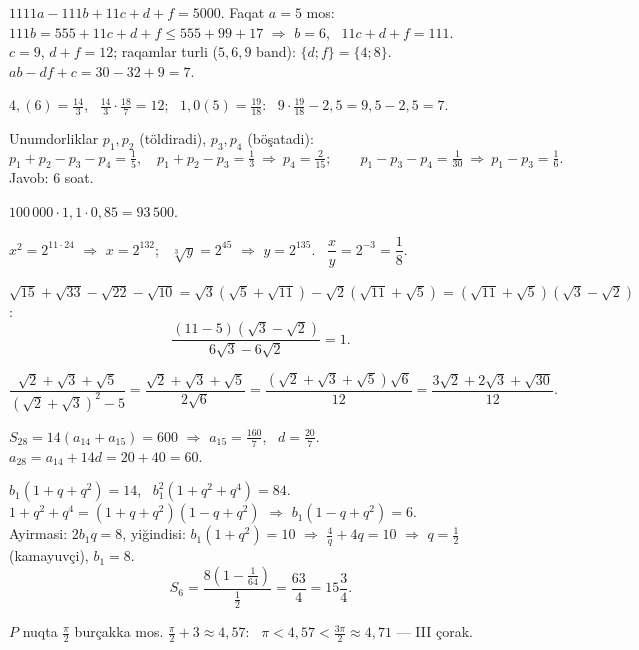 




$1111a-111b+11c+d+f=5000$. Faqat $a=5$ mos: $111b=555+11c+d+f\le555+99+17$ $\Rightarrow$ $b=6$, \ $11c+d+f=111$.\\
$c=9$, $d+f=12$; raqamlar turli ($5,6,9$ band): $\{d;f\}=\{4;8\}$. \ $ab-df+c=30-32+9=7$.

$4{,}(6)=\frac{14}3$, \ $\frac{14}3\cdot\frac{18}7=12$; \ $1{,}0(5)=\frac{19}{18}$: \ $9\cdot\frac{19}{18}-2{,}5=9{,}5-2{,}5=7$.

Unumdorliklar $p_1,p_2$ (töldiradi), $p_3,p_4$ (böşatadi):
\[p_1+p_2-p_3-p_4=\tfrac15,\quad p_1+p_2-p_3=\tfrac13\ \Rightarrow\ p_4=\tfrac2{15};\qquad p_1-p_3-p_4=\tfrac1{30}\ \Rightarrow\ p_1-p_3=\tfrac16.\]
Javob: $6$ soat.

$100\,000\cdot1{,}1\cdot0{,}85=93\,500$.

$x^2=2^{11\cdot24}$ $\Rightarrow$ $x=2^{132}$; \ $\sqrt[3]y=2^{45}$ $\Rightarrow$ $y=2^{135}$. \ $\dfrac xy=2^{-3}=\dfrac18$.

$\sqrt{15}+\sqrt{33}-\sqrt{22}-\sqrt{10}=\sqrt3\left(\sqrt5+\sqrt{11}\right)-\sqrt2\left(\sqrt{11}+\sqrt5\right)=\left(\sqrt{11}+\sqrt5\right)\left(\sqrt3-\sqrt2\right)$:
\[\frac{(11-5)\left(\sqrt3-\sqrt2\right)}{6\sqrt3-6\sqrt2}=1.\]

\[\frac{\sqrt2+\sqrt3+\sqrt5}{\left(\sqrt2+\sqrt3\right)^2-5}=\frac{\sqrt2+\sqrt3+\sqrt5}{2\sqrt6}=\frac{\left(\sqrt2+\sqrt3+\sqrt5\right)\sqrt6}{12}=\frac{3\sqrt2+2\sqrt3+\sqrt{30}}{12}.\]

$S_{28}=14(a_{14}+a_{15})=600$ $\Rightarrow$ $a_{15}=\frac{160}7$, \ $d=\frac{20}7$. \ $a_{28}=a_{14}+14d=20+40=60$.

$b_1\left(1+q+q^2\right)=14$, \ $b_1^2\left(1+q^2+q^4\right)=84$. \ $1+q^2+q^4=\left(1+q+q^2\right)\left(1-q+q^2\right)$ $\Rightarrow$ $b_1\left(1-q+q^2\right)=6$.\\
Ayirmasi: $2b_1q=8$, yiğindisi: $b_1\left(1+q^2\right)=10$ $\Rightarrow$ $\frac4q+4q=10$ $\Rightarrow$ $q=\frac12$ (kamayuvçi), $b_1=8$.
\[S_6=\frac{8\left(1-\frac1{64}\right)}{\frac12}=\frac{63}4=15\frac34.\]

$P$ nuqta $\frac\pi2$ burçakka mos. $\frac\pi2+3\approx4{,}57$: \ $\pi<4{,}57<\frac{3\pi}2\approx4{,}71$ — III çorak.

